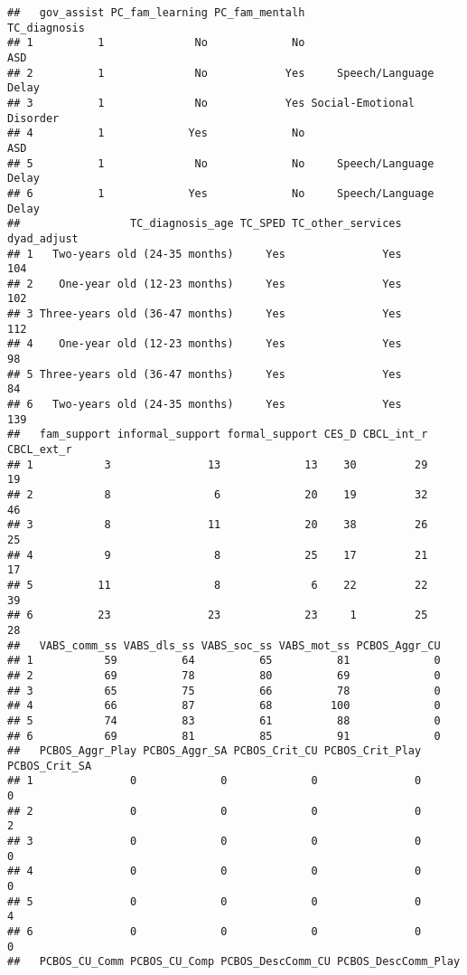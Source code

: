 \documentclass[
]{article}
\begin{document}
\begin{verbatim}
##   gov_assist PC_fam_learning PC_fam_mentalh              TC_diagnosis
## 1          1              No             No                       ASD
## 2          1              No            Yes     Speech/Language Delay
## 3          1              No            Yes Social-Emotional Disorder
## 4          1             Yes             No                       ASD
## 5          1              No             No     Speech/Language Delay
## 6          1             Yes             No     Speech/Language Delay
##                 TC_diagnosis_age TC_SPED TC_other_services dyad_adjust
## 1   Two-years old (24-35 months)     Yes               Yes         104
## 2    One-year old (12-23 months)     Yes               Yes         102
## 3 Three-years old (36-47 months)     Yes               Yes         112
## 4    One-year old (12-23 months)     Yes               Yes          98
## 5 Three-years old (36-47 months)     Yes               Yes          84
## 6   Two-years old (24-35 months)     Yes               Yes         139
##   fam_support informal_support formal_support CES_D CBCL_int_r CBCL_ext_r
## 1           3               13             13    30         29         19
## 2           8                6             20    19         32         46
## 3           8               11             20    38         26         25
## 4           9                8             25    17         21         17
## 5          11                8              6    22         22         39
## 6          23               23             23     1         25         28
##   VABS_comm_ss VABS_dls_ss VABS_soc_ss VABS_mot_ss PCBOS_Aggr_CU
## 1           59          64          65          81             0
## 2           69          78          80          69             0
## 3           65          75          66          78             0
## 4           66          87          68         100             0
## 5           74          83          61          88             0
## 6           69          81          85          91             0
##   PCBOS_Aggr_Play PCBOS_Aggr_SA PCBOS_Crit_CU PCBOS_Crit_Play PCBOS_Crit_SA
## 1               0             0             0               0             0
## 2               0             0             0               0             2
## 3               0             0             0               0             0
## 4               0             0             0               0             0
## 5               0             0             0               0             4
## 6               0             0             0               0             0
##   PCBOS_CU_Comm PCBOS_CU_Comp PCBOS_DescComm_CU PCBOS_DescComm_Play

\end{verbatim}
\end{document}
